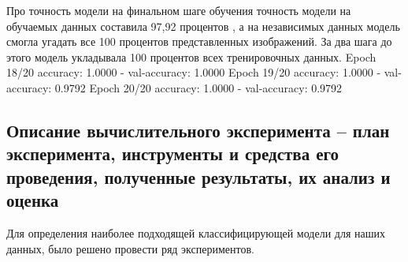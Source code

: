 Про точность модели 
на финальном шаге обучения точность модели на обучаемых данных составила 97,92 процентов , а на независимых данных модель смогла угадать все 100 процентов представленных изображений. 
За два шага до этого модель укладывала 100 процентов всех тренировочных данных. \newline
Epoch 18/20 \newline
accuracy: 1.0000 - val-accuracy: 1.0000 \newline
Epoch 19/20\newline
accuracy: 1.0000 - val-accuracy: 0.9792\newline
Epoch 20/20\newline
accuracy: 1.0000 - val-accuracy: 0.9792\newline
\begin{figure}[H]
\end{figure}
\subsection{Описание вычислительного эксперимента -- план эксперимента, инструменты и средства его проведения, полученные результаты, их анализ и оценка}

Для определения наиболее подходящей классифицирующей модели для наших данных, было решено провести ряд экспериментов.


